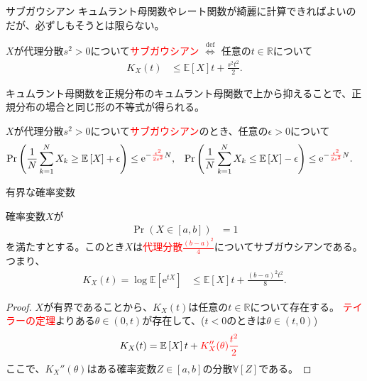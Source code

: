 \documentclass[lualatex,handout]{beamer}
\newcommand{\emm}[1]{\textcolor{red}{#1}}
\newcommand{\expt}[1]{\mathbb{E}\left[#1\right]}
\newcommand{\var}[1]{\mathbb{V}\left[#1\right]}
\theoremstyle{definition}
\begin{document}
\begin{frame}{サブガウシアン}
\small
キュムラント母関数やレート関数が綺麗に計算できればよいのだが、必ずしもそうとは限らない。

\vspace{1em}
\begin{definition}
$X$が代理分散$s^2>0$について\emm{サブガウシアン} $\stackrel{\mathrm{def}}{\iff}$ 任意の$t\in\mathbb{R}$について
\begin{align*}
K_X(t) &\le {\expt{X}t+\frac{s^2t^2}2}.
\end{align*}
\end{definition}

\vspace{1em}
キュムラント母関数を正規分布のキュムラント母関数で上から抑えることで、正規分布の場合と同じ形の不等式が得られる。

$X$が代理分散$s^2>0$について\emm{サブガウシアン}のとき、任意の$\epsilon>0$について
\begin{align*}
\Pr\left(\frac1N\sum_{k=1}^N X_k \ge \expt{X} + \epsilon\right) &\le \mathrm{e}^{-\emm{\frac{\epsilon^2}{2s^2}}N},&
\Pr\left(\frac1N\sum_{k=1}^N X_k \le \expt{X} - \epsilon\right) &\le \mathrm{e}^{-\emm{\frac{\epsilon^2}{2s^2}}N}.
\end{align*}
\end{frame}

\begin{frame}{有界な確率変数}
\small
\begin{lemma}
確率変数$X$が
\begin{align*}
\Pr(X\in[a,b])&=1
\end{align*}
を満たすとする。このとき$X$は\emm{代理分散$\frac{(b-a)^2}4$}についてサブガウシアンである。
つまり、
\begin{align*}
K_X(t)=\log\expt{\mathrm{e}^{tX}} &\le \expt{X}t + \frac{(b-a)^2t^2}8.
\end{align*}
\end{lemma}
\begin{proof}
$X$が有界であることから、$K_X(t)$は任意の$t\in\mathbb{R}$について存在する。
\emm{テイラーの定理}よりある$\theta\in(0,t)$が存在して、($t<0$のときは$\theta\in(t, 0)$)
\begin{align*}
K_X(t) &= \expt{X}t + \emm{K_X''(\theta)\frac{t^2}2}
\end{align*}
ここで、$K_X''(\theta)$はある確率変数$Z\in[a,b]$の分散$\var{Z}$である。
\end{proof}
\end{frame}
\end{document}
